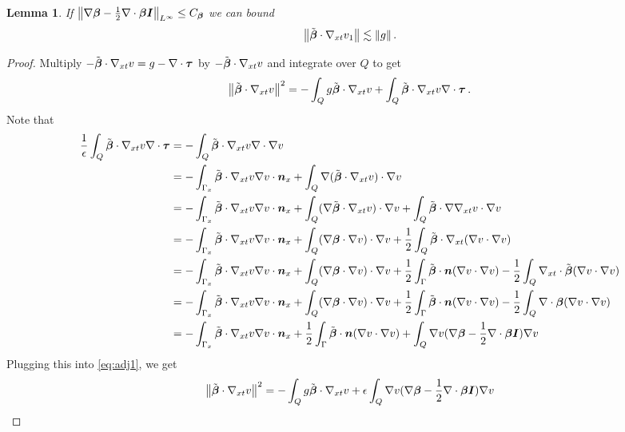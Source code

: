 \documentclass{article}
\newtheorem{lemma}[theorem]{Lemma}
\theoremstyle{definition}
\theoremstyle{remark}
\begin{document}
\begin{lemma}
\label{lem:convective}
If 
$
\left\| \nabla\boldsymbol\beta-\frac{1}{2}\nabla\cdot\boldsymbol\beta\boldsymbol I \right\|_{L^{\infty}}\le C_{\boldsymbol\beta}
$
we can bound
\[
\left\| \tilde{\boldsymbol\beta}\cdot\nabla_{xt} v_1 \right\|\lesssim \left\| g \right\|.
\]
\end{lemma}
\begin{proof}
Multiply $-\tilde{\boldsymbol\beta}\cdot\nabla_{xt} v=g-\nabla\cdot\boldsymbol\tau$ by $-\tilde{\boldsymbol\beta}\cdot\nabla_{xt} v$ and integrate over $Q$ to get
\begin{equation}
\label{eq:adj1}
\left\| \tilde{\boldsymbol\beta}\cdot\nabla_{xt} v \right\|^2=-\int_Q g\tilde{\boldsymbol\beta}\cdot\nabla_{xt} v+\int_Q\tilde{\boldsymbol\beta}\cdot\nabla_{xt} v\nabla\cdot\boldsymbol\tau\,.
\end{equation}
Note that
\begin{align*}
\frac{1}{\epsilon}\int_Q\tilde\bfbeta\cdot\Gradxt v\Div\bftau&=-\int_Q\tilde\bfbeta\cdot\Gradxt v\Div\Grad v \\
%
&=-\int_{\Gamma_x}\tilde\bfbeta\cdot\Gradxt v\Grad v\cdot\bfn_x
+\int_Q\Grad(\tilde\bfbeta\cdot\Gradxt v)\cdot\Grad v \\
%
&=-\int_{\Gamma_x}\tilde\bfbeta\cdot\Gradxt v\Grad v\cdot\bfn_x
+\int_Q(\Grad\tilde\bfbeta\cdot\Gradxt v)\cdot\Grad v
+\int_Q\tilde\bfbeta\cdot\Grad\Gradxt v\cdot\Grad v\\
%
&=-\int_{\Gamma_x}\tilde\bfbeta\cdot\Gradxt v\Grad v\cdot\bfn_x
+\int_Q(\Grad\bfbeta\cdot\Grad v)\cdot\Grad v
+\frac{1}{2}\int_Q\tilde\bfbeta\cdot\Gradxt(\Grad v\cdot\Grad v)\\
%
&=-\int_{\Gamma_x}\tilde\bfbeta\cdot\Gradxt v\Grad v\cdot\bfn_x
+\int_Q(\Grad\bfbeta\cdot\Grad v)\cdot\Grad v
+\frac{1}{2}\int_\Gamma\tilde\bfbeta\cdot\bfn(\Grad v\cdot\Grad v)
-\frac{1}{2}\int_Q\Divxt\tilde\bfbeta(\Grad v\cdot\Grad v)\\
%
&=-\int_{\Gamma_x}\tilde\bfbeta\cdot\Gradxt v\Grad v\cdot\bfn_x
+\int_Q(\Grad\bfbeta\cdot\Grad v)\cdot\Grad v
+\frac{1}{2}\int_\Gamma\tilde\bfbeta\cdot\bfn(\Grad v\cdot\Grad v)
-\frac{1}{2}\int_Q\Div\bfbeta(\Grad v\cdot\Grad v)\\
%
&=-\int_{\Gamma_x}\tilde\bfbeta\cdot\Gradxt v\Grad v\cdot\bfn_x
+\frac{1}{2}\int_\Gamma\tilde\bfbeta\cdot\bfn(\Grad v\cdot\Grad v)
+\int_Q\Grad v(\Grad\bfbeta-\frac{1}{2}\Div\bfbeta\bfI)\Grad v\\
\end{align*}
Plugging this into \eqref{eq:adj1}, we get
\begin{align*}
\norm{\tilde\bfbeta\cdot\Gradxt v}^2
&=-\int_Q g\tilde\bfbeta\cdot\Gradxt v
+\epsilon\int_Q\Grad v(\Grad\bfbeta-\frac{1}{2}\Div\bfbeta\bfI)\Grad v\\

\end{align*}
\end{proof}
\end{document}
